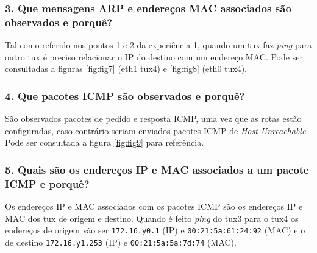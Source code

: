 \subsubsection{3. Que mensagens ARP e endereços MAC associados são observados e porquê?}
Tal como referido nos pontos 1 e 2 da experiência 1, quando um tux faz \emph{ping} para outro tux é preciso relacionar o IP do destino com um endereço MAC. Pode ser consultadas a figuras \ref{fig:fig7} (eth1 tux4) e \ref{fig:fig8} (eth0 tux4).

\subsubsection{4. Que pacotes ICMP são observados e porquê?}
São observados pacotes de pedido e resposta ICMP, uma vez que as rotas estão configuradas, caso contrário seriam enviados pacotes ICMP de \emph{Host Unreachable}. Pode ser consultada a figura \ref{fig:fig9} para referência.

\subsubsection{5. Quais são os endereços IP e MAC associados a um pacote ICMP e porquê?}
Os endereços IP e MAC associados com os pacotes ICMP são os endereços IP e MAC dos tux de origem e destino. Quando é feito \emph{ping} do tux3 para o tux4 os endereços de origem vão ser \verb+172.16.y0.1+ (IP) e \verb+00:21:5a:61:24:92+ (MAC) e o de destino \verb+172.16.y1.253+ (IP) e \verb+00:21:5a:5a:7d:74+ (MAC).
